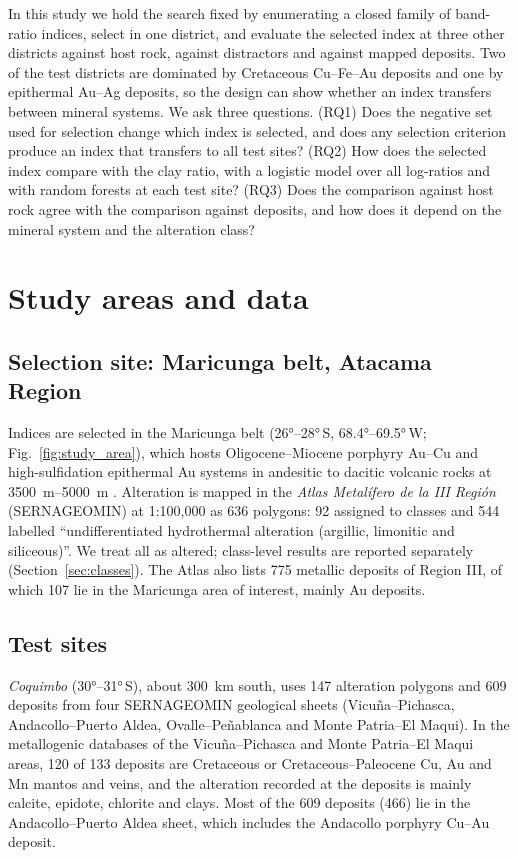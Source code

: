 \documentclass[preprint,authoryear,number]{elsarticle}
\begin{document}
In this study we hold the search fixed by enumerating a closed family of band-ratio indices, select in one district, and evaluate the selected index at three other districts against host rock, against distractors and against mapped deposits. Two of the test districts are dominated by Cretaceous Cu--Fe--Au deposits and one by epithermal Au--Ag deposits, so the design can show whether an index transfers between mineral systems. We ask three questions. (RQ1) Does the negative set used for selection change which index is selected, and does any selection criterion produce an index that transfers to all test sites? (RQ2) How does the selected index compare with the clay ratio, with a logistic model over all log-ratios and with random forests at each test site? (RQ3) Does the comparison against host rock agree with the comparison against deposits, and how does it depend on the mineral system and the alteration class?

\section{Study areas and data}
\label{sec:data}

\subsection{Selection site: Maricunga belt, Atacama Region}

Indices are selected in the Maricunga belt (\ang{26}--\ang{28}\,S, \ang{68.4}--\ang{69.5}\,W; Fig.~\ref{fig:study_area}), which hosts Oligocene--Miocene porphyry Au--Cu and high-sulfidation epithermal Au systems in andesitic to dacitic volcanic rocks at \SIrange{3500}{5000}{\meter} \citep{Sillitoe1991,Vila1991}. Alteration is mapped in the \emph{Atlas Metal\'ifero de la III Regi\'on} (SERNAGEOMIN) at 1:100{,}000 as 636 polygons: 92 assigned to classes and 544 labelled ``undifferentiated hydrothermal alteration (argillic, limonitic and siliceous)''. We treat all as altered; class-level results are reported separately (Section~\ref{sec:classes}). The Atlas also lists 775 metallic deposits of Region III, of which 107 lie in the Maricunga area of interest, mainly Au deposits.

\subsection{Test sites}

\emph{Coquimbo} (\ang{30}--\ang{31}\,S), about \SI{300}{\kilo\meter} south, uses 147 alteration polygons and 609 deposits from four SERNAGEOMIN geological sheets (Vicu\~na--Pichasca, Andacollo--Puerto Aldea, Ovalle--Pe\~nablanca and Monte Patria--El Maqui). In the metallogenic databases of the Vicu\~na--Pichasca and Monte Patria--El Maqui areas, 120 of 133 deposits are Cretaceous or Cretaceous--Paleocene Cu, Au and Mn mantos and veins, and the alteration recorded at the deposits is mainly calcite, epidote, chlorite and clays. Most of the 609 deposits (466) lie in the Andacollo--Puerto Aldea sheet, which includes the Andacollo porphyry Cu--Au deposit.
\end{document}
